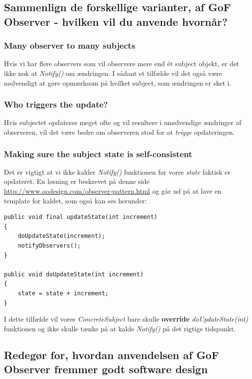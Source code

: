 \subsection{Sammenlign de forskellige varianter, af GoF Observer - hvilken vil du anvende hvornår?}
\subsubsection{Many observer to many subjects}
Hvis vi har flere observers som vil observere mere end ét subject objekt, er det ikke nok at \textit{Notify()} om ændringen. I sådant et tilfælde vil det også være nødvendigt at gøre opmærksom på hvilket subject, som ændringen er sket i.

\subsubsection{Who triggers the update?}
Hvis subjectet opdateres meget ofte og vil resultere i unødvendige ændringer af observeren, vil det være bedre om observeren stod for at \textit{trigge} opdateringen.

\subsubsection{Making sure the subject state is self-consistent}
Det er vigtigt at vi ikke kalder \textit{Notify()} funktionen før vores \textit{state} faktisk er opdateret. En løsning er beskrevet på denne side \url{http://www.oodesign.com/observer-pattern.html} og går ud på at lave en template for kaldet, som også kan ses herunder:

\begin{lstlisting}
public void final updateState(int increment)
{
	doUpdateState(increment);
	notifyObservers();
}

public void doUpdateState(int increment)
{
	state = state + increment;		
}
\end{lstlisting}

I dette tilfælde vil vores \textit{ConcreteSubject} bare skulle \textbf{override} \textit{doUpdateState(int)} funktionen og ikke skulle tænke på at kalde \textit{Notify()} på det rigtige tidspunkt.

\subsection{Redegør for, hvordan anvendelsen af GoF Observer fremmer godt software design}

